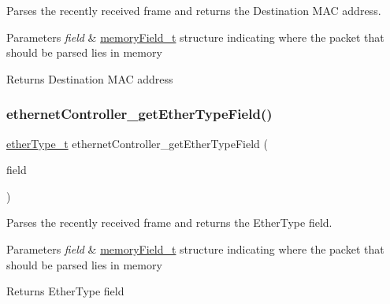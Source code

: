 Parses the recently received frame and returns the Destination M\+AC address. 


\begin{DoxyParams}{Parameters}
{\em field} & \mbox{\hyperlink{group__memory_ga1d04d80fae40964f55d2df46b5d64785}{memory\+Field\+\_\+t}} structure indicating where the packet that should be parsed lies in memory \\
\hline
\end{DoxyParams}
\begin{DoxyReturn}{Returns}
Destination M\+AC address 
\end{DoxyReturn}
\mbox{\label{group__data__reception_ga84354a03e54526ac8a820650886458f4}} 
\subsubsection{\texorpdfstring{ethernetController\_getEtherTypeField()}{ethernetController\_getEtherTypeField()}}
{\footnotesize\ttfamily \mbox{\hyperlink{group__ethernet_ga467703afefdcaf7893a7da3eb63280ed}{ether\+Type\+\_\+t}} ethernet\+Controller\+\_\+get\+Ether\+Type\+Field (\begin{DoxyParamCaption}\item[{\mbox{\hyperlink{group__memory_ga1d04d80fae40964f55d2df46b5d64785}{memory\+Field\+\_\+t}}}]{field }\end{DoxyParamCaption})}



Parses the recently received frame and returns the Ether\+Type field. 


\begin{DoxyParams}{Parameters}
{\em field} & \mbox{\hyperlink{group__memory_ga1d04d80fae40964f55d2df46b5d64785}{memory\+Field\+\_\+t}} structure indicating where the packet that should be parsed lies in memory \\
\hline
\end{DoxyParams}
\begin{DoxyReturn}{Returns}
Ether\+Type field 
\end{DoxyReturn}
\mbox{\label{group__data__reception_gae3335ee23b52ab5086b95f83127b755c}} 
